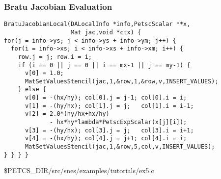 \begin{frame}[fragile]
\frametitle{Bratu Jacobian Evaluation}

\small
\begin{verbatim}
BratuJacobianLocal(DALocalInfo *info,PetscScalar **x,
                   Mat jac,void *ctx) {
for(j = info->ys; j < info->ys + info->ym; j++) {
  for(i = info->xs; i < info->xs + info->xm; i++) {
    row.j = j; row.i = i;
    if (i == 0 || j == 0 || i == mx-1 || j == my-1) {
      v[0] = 1.0;
      MatSetValuesStencil(jac,1,&row,1,&row,v,INSERT_VALUES);
    } else {
      v[0] = -(hx/hy); col[0].j = j-1; col[0].i = i;
      v[1] = -(hy/hx); col[1].j = j;   col[1].i = i-1;
      v[2] = 2.0*(hy/hx+hx/hy)
             - hx*hy*lambda*PetscExpScalar(x[j][i]);
      v[3] = -(hy/hx); col[3].j = j;   col[3].i = i+1;
      v[4] = -(hx/hy); col[4].j = j+1; col[4].i = i;
      MatSetValuesStencil(jac,1,&row,5,col,v,INSERT_VALUES);
} } } }
\end{verbatim}

\begin{center}\small
\$PETCS\_DIR/src/snes/examples/tutorials/ex5.c
\end{center}
\end{frame}

